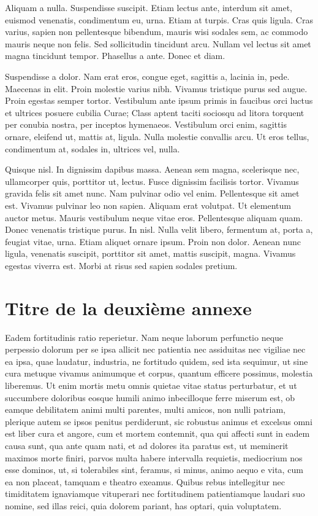 \documentclass[twoside]{extreport}
\begin{document}
Aliquam a nulla. Suspendisse suscipit. Etiam lectus ante, interdum sit
amet, euismod venenatis, condimentum eu, urna. Etiam at turpis. Cras
quis ligula. Cras varius, sapien non pellentesque bibendum, mauris wisi
sodales sem, ac commodo mauris neque non felis. Sed sollicitudin
tincidunt arcu. Nullam vel lectus sit amet magna tincidunt tempor.
Phasellus a ante. Donec et diam.

Suspendisse a dolor. Nam erat eros, congue eget, sagittis a, lacinia in,
pede. Maecenas in elit. Proin molestie varius nibh. Vivamus tristique
purus sed augue. Proin egestas semper tortor. Vestibulum ante ipsum
primis in faucibus orci luctus et ultrices posuere cubilia Curae; Class
aptent taciti sociosqu ad litora torquent per conubia nostra, per
inceptos hymenaeos. Vestibulum orci enim, sagittis ornare, eleifend ut,
mattis at, ligula. Nulla molestie convallis arcu. Ut eros tellus,
condimentum at, sodales in, ultrices vel, nulla.

Quisque nisl. In dignissim dapibus massa. Aenean sem magna, scelerisque
nec, ullamcorper quis, porttitor ut, lectus. Fusce dignissim facilisis
tortor. Vivamus gravida felis sit amet nunc. Nam pulvinar odio vel enim.
Pellentesque sit amet est. Vivamus pulvinar leo non sapien. Aliquam erat
volutpat. Ut elementum auctor metus. Mauris vestibulum neque vitae eros.
Pellentesque aliquam quam. Donec venenatis tristique purus. In nisl.
Nulla velit libero, fermentum at, porta a, feugiat vitae, urna. Etiam
aliquet ornare ipsum. Proin non dolor. Aenean nunc ligula, venenatis
suscipit, porttitor sit amet, mattis suscipit, magna. Vivamus egestas
viverra est. Morbi at risus sed sapien sodales pretium.

\hypertarget{titre-de-la-deuxiuxe8me-annexe}{%
\chapter{Titre de la deuxième
annexe}\label{titre-de-la-deuxiuxe8me-annexe}}

Eadem fortitudinis ratio reperietur. Nam neque laborum perfunctio neque
perpessio dolorum per se ipsa allicit nec patientia nec assiduitas nec
vigiliae nec ea ipsa, quae laudatur, industria, ne fortitudo quidem, sed
ista sequimur, ut sine cura metuque vivamus animumque et corpus, quantum
efficere possimus, molestia liberemus. Ut enim mortis metu omnis quietae
vitae status perturbatur, et ut succumbere doloribus eosque humili animo
inbecilloque ferre miserum est, ob eamque debilitatem animi multi
parentes, multi amicos, non nulli patriam, plerique autem se ipsos
penitus perdiderunt, sic robustus animus et excelsus omni est liber cura
et angore, cum et mortem contemnit, qua qui affecti sunt in eadem causa
sunt, qua ante quam nati, et ad dolores ita paratus est, ut meminerit
maximos morte finiri, parvos multa habere intervalla requietis,
mediocrium nos esse dominos, ut, si tolerabiles sint, feramus, si minus,
animo aequo e vita, cum ea non placeat, tamquam e theatro exeamus.
Quibus rebus intellegitur nec timiditatem ignaviamque vituperari nec
fortitudinem patientiamque laudari suo nomine, sed illas reici, quia
dolorem pariant, has optari, quia voluptatem.
\end{document}
